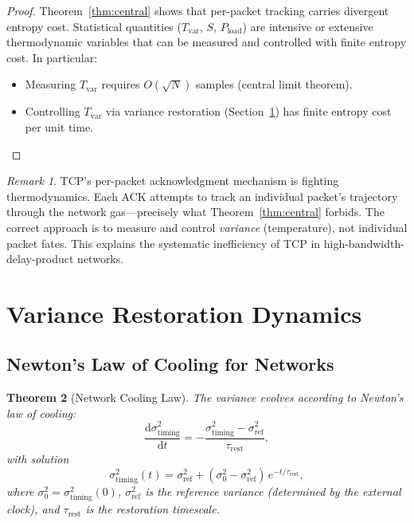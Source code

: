 \documentclass[11pt,twocolumn,a4paper]{article}
\newtheorem{theorem}{Theorem}[section]
\theoremstyle{definition}
\theoremstyle{remark}
\newtheorem{remark}[theorem]{Remark}
\newcommand{\Tvar}{T_{\mathrm{var}}}
\newcommand{\Pload}{P_{\mathrm{load}}}
\newcommand{\sigtime}{\sigma^{2}_{\mathrm{timing}}}
\newcommand{\trest}{\tau_{\mathrm{rest}}}
\newcommand{\dd}{\mathrm{d}}
\begin{document}
\begin{proof}
Theorem~\ref{thm:central} shows that per-packet tracking carries divergent
entropy cost.  Statistical quantities ($\Tvar$, $S$, $\Pload$) are intensive
or extensive thermodynamic variables that can be measured and controlled with
finite entropy cost.  In particular:
\begin{itemize}
  \item Measuring $\Tvar$ requires $O(\sqrt{N})$ samples (central limit theorem).
  \item Controlling $\Tvar$ via variance restoration (Section~\ref{sec:variance})
        has finite entropy cost per unit time.
\end{itemize}
\end{proof}

\begin{remark}
TCP's per-packet acknowledgment mechanism is fighting thermodynamics.  Each
ACK attempts to track an individual packet's trajectory through the network
gas---precisely what Theorem~\ref{thm:central} forbids.  The correct
approach is to measure and control \emph{variance} (temperature), not
individual packet fates.  This explains the systematic inefficiency of
TCP in high-bandwidth-delay-product networks.
\end{remark}

\section{Variance Restoration Dynamics}\label{sec:variance}

\subsection{Newton's Law of Cooling for Networks}\label{sec:newton_cooling}

\begin{theorem}[Network Cooling Law]\label{thm:cooling}
The variance evolves according to Newton's law of cooling:
\begin{equation}\label{eq:cooling}
  \frac{\dd\sigtime}{\dd t} = -\frac{\sigtime-\sigma^2_{\mathrm{ref}}}{\trest},
\end{equation}
with solution
\begin{equation}\label{eq:cooling_soln}
  \sigtime(t) = \sigma^2_{\mathrm{ref}}
  + (\sigma^2_0-\sigma^2_{\mathrm{ref}})\,e^{-t/\trest},
\end{equation}
where $\sigma^2_0=\sigtime(0)$, $\sigma^2_{\mathrm{ref}}$ is the reference
variance (determined by the external clock), and $\trest$ is the restoration
timescale.
\end{theorem}
\end{document}

